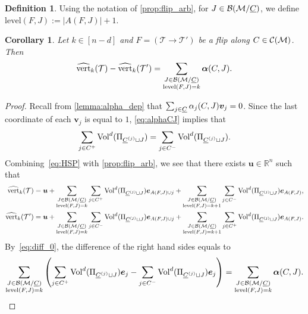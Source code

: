 \documentclass[11pt]{amsart}
\theoremstyle{plain}
\newtheorem{corollary}[theorem]{Corollary}
\theoremstyle{definition}
\newtheorem{definition}[theorem]{Definition}
\def\R{\mathbb{R}}
\def\v{{\bm{v}}}
\def\u{{\bm{u}}}
\def\e{{\bm{e}}}
\def\Vol{\mathrm{Vol}}
\def\level{\mathrm{level}}
\newcommand\wh[1]{\hstretch{2}{\hat{\hstretch{0.5}{#1}}}}
\def\vert{\mathrm{vert}}
\def\vertHSP{\wh\vert}
\def\vertHSP{\widehat{\vert}}
\def\Tcal{\mathcal{T}}
\def\suppC{{\underline{C}}}
\def\Tiling{\Tcal}
\def\tile{\Pi}
\newcommand\summa[2]{\sum_{\substack{#1 \\ #2}}}
\def\VolX(#1){\Vol^d(\tile_{#1})}
\begin{document}
\begin{definition}\label{def2:level}
Using the notation of  
	\cref{prop:flip_arb},
for $J\in\BMC$, we define $\level(F,J):=|A(F,J)|+1$.
\end{definition}

\begin{corollary}\label{cor:flip2}
Let $k\in [n-d]$ and $F=(\Tiling\to\Tiling')$ be a flip along $C\in\mathcal{C}(\mathcal{M})$. Then
\[\vertHSP_k(\Tiling)-\vertHSP_k(\Tiling')=\summa{J\in\BMC}{\level(F,J)=k} \alphaCJ.\]
\end{corollary}
\begin{proof}
Recall from \cref{lemma:alpha_dep} that $\sum_{j\in\suppC}\alphaCJx_j\v_j=0$. 
Since the last coordinate of each $\v_j$ is equal to $1$, \eqref{eq:alphaCJ} implies that 
\begin{equation}\label{eq:diff_0}
  \sum_{j\in C^+} \VolX(\sC^j\sqcup J)=\sum_{j\in C^-} \VolX(\sC^j\sqcup J).
\end{equation}
Combining~\eqref{eq:HSP} with \cref{prop:flip_arb}, we see that there exists $\u\in\R^n$ such that
\begin{align*}
  \vertHSP_k(\Tiling)&=\u+\summa{J\in\BMC}{\level(F,J)=k}  \sum_{j\in C^+}\VolX(\sC^j\sqcup J) \e_{A(F,J)\cup j}+ \summa{J\in\BMC}{\level(F,J)=k+1}  \sum_{j\in C^-}\VolX(\sC^j\sqcup J) \e_{A(F,J)},\\
  \vertHSP_k(\Tiling')&=\u+\summa{J\in\BMC}{\level(F,J)=k}  \sum_{j\in C^-}\VolX(\sC^j\sqcup J) \e_{A(F,J)\cup j}+ \summa{J\in\BMC}{\level(F,J)=k+1}  \sum_{j\in C^+}\VolX(\sC^j\sqcup J) \e_{A(F,J)}.\\
\end{align*}
  By~\eqref{eq:diff_0}, the difference of the right hand sides equals to 
\[\summa{J\in\BMC}{\level(F,J)=k} \left(\sum_{j\in C^+} \VolX(\sC^j\sqcup J)\e_j-\sum_{j\in C^-} \VolX(\sC^j\sqcup J)\e_j\right)=\summa{J\in\BMC}{\level(F,J)=k}\alphaCJ.\qedhere\]
\end{proof}
\end{document}
